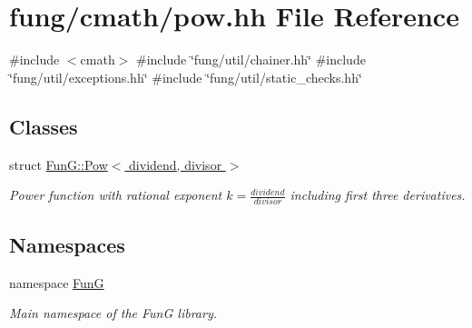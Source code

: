 \hypertarget{pow_8hh}{\section{fung/cmath/pow.hh \-File \-Reference}
\label{pow_8hh}
}
{\ttfamily \#include $<$cmath$>$}\*
{\ttfamily \#include \char`\"{}fung/util/chainer.\-hh\char`\"{}}\*
{\ttfamily \#include \char`\"{}fung/util/exceptions.\-hh\char`\"{}}\*
{\ttfamily \#include \char`\"{}fung/util/static\-\_\-checks.\-hh\char`\"{}}\*
\subsection*{\-Classes}
\begin{DoxyCompactItemize}
\item 
struct \hyperlink{structFunG_1_1Pow}{\-Fun\-G\-::\-Pow$<$ dividend, divisor $>$}
\begin{DoxyCompactList}\small\item\em \-Power function with rational exponent $ k = \frac{dividend}{divisor} $ including first three derivatives. \end{DoxyCompactList}\end{DoxyCompactItemize}
\subsection*{\-Namespaces}
\begin{DoxyCompactItemize}
\item 
namespace \hyperlink{namespaceFunG}{\-Fun\-G}
\begin{DoxyCompactList}\small\item\em \-Main namespace of the \-Fun\-G library. \end{DoxyCompactList}\end{DoxyCompactItemize}
